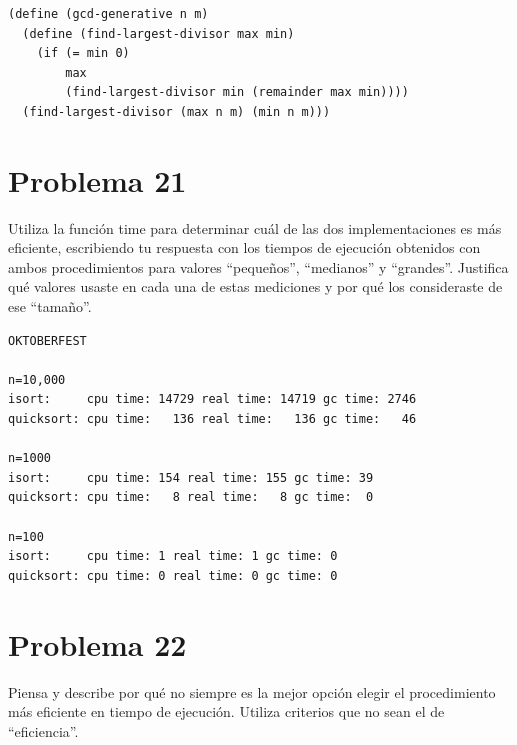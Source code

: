 \documentclass[a4paper,11pt]{article}
\theoremstyle{mytheor}
\begin{document}
\begin{lstlisting}[title = gcd-generative]
(define (gcd-generative n m)
  (define (find-largest-divisor max min)
    (if (= min 0)
        max
        (find-largest-divisor min (remainder max min))))
  (find-largest-divisor (max n m) (min n m)))
\end{lstlisting}



\section*{Problema 21}
Utiliza la función time para determinar cuál de las dos implementaciones es más
eficiente, escribiendo tu respuesta con los tiempos de ejecución obtenidos con ambos procedimientos
para valores “pequeños”, “medianos” y “grandes”. Justifica qué valores usaste en cada una de estas
mediciones y por qué los consideraste de ese “tamaño”.
\begin{lstlisting}[title= timing quicksort and isort]
OKTOBERFEST 

n=10,000
isort:     cpu time: 14729 real time: 14719 gc time: 2746
quicksort: cpu time:   136 real time:   136 gc time:   46

n=1000
isort:     cpu time: 154 real time: 155 gc time: 39
quicksort: cpu time:   8 real time:   8 gc time:  0

n=100
isort:     cpu time: 1 real time: 1 gc time: 0
quicksort: cpu time: 0 real time: 0 gc time: 0

\end{lstlisting}

\section*{Problema 22}
Piensa y describe por qué no siempre es la mejor opción elegir el procedimiento más
eficiente en tiempo de ejecución. Utiliza criterios que no sean el de “eficiencia”.
\end{document}
